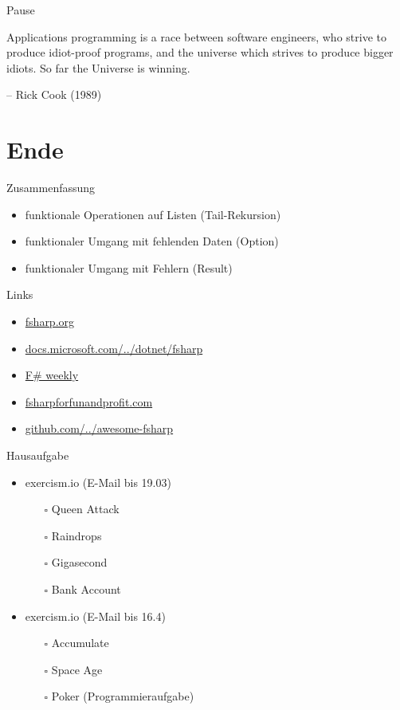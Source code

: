 \documentclass[t]{beamer}
\begin{document}
\begin{frame}[label={sec:org85b2ee7}]{Pause}
\begin{block}{}
Applications programming is a race between software engineers, 
who strive to produce idiot-proof programs, 
and the universe which strives to produce bigger idiots. 
So far the Universe is winning.

\null\hfill-- Rick Cook (1989)
\end{block}
\end{frame}

\section{Ende }
\label{sec:org6921f9f}
\begin{frame}[label={sec:org659c59e}]{Zusammenfassung}
\begin{itemize}
\item funktionale Operationen auf Listen (Tail-Rekursion)
\item funktionaler Umgang mit fehlenden Daten (Option)
\item funktionaler Umgang mit Fehlern (Result)
\end{itemize}
\end{frame}

\begin{frame}[label={sec:orgd4abb9a}]{Links}
\begin{itemize}
\item \href{https://fsharp.org/}{fsharp.org}
\item \href{https://docs.microsoft.com/de-de/dotnet/fsharp/}{docs.microsoft.com/../dotnet/fsharp}
\item \href{https://sergeytihon.com/}{F\# weekly}
\item \href{https://fsharpforfunandprofit.com/}{fsharpforfunandprofit.com}
\item \href{https://github.com/fsprojects/awesome-fsharp}{github.com/../awesome-fsharp}
\end{itemize}
\end{frame}

\begin{frame}[label={sec:orgfe01206}]{Hausaufgabe}
\begin{itemize}
\item exercism.io (E-Mail bis 19.03)
\begin{itemize}
\item[{$\square$}] Queen Attack
\item[{$\square$}] Raindrops
\item[{$\square$}] Gigasecond
\item[{$\square$}] Bank Account
\end{itemize}

\item exercism.io (E-Mail bis 16.4)
\begin{itemize}
\item[{$\square$}] Accumulate
\item[{$\square$}] Space Age
\item[{$\square$}] Poker (Programmieraufgabe)
\end{itemize}
\end{itemize}
\end{frame}
\end{document}
